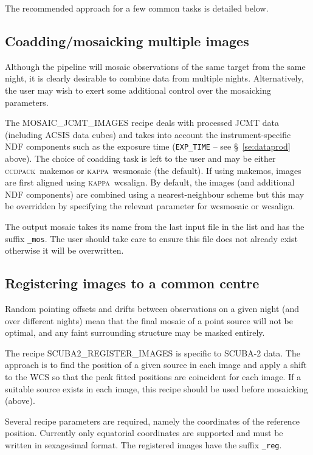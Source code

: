 \documentclass[twoside,11pt,nolof]{starlink}
\providecommand{\CCDPACK}{\textsc{ccdpack}}
\providecommand{\KAPPA}{\textsc{kappa}}
\providecommand{\task}[1]{\textsf{#1}}
\begin{document}
The recommended approach for a few common tasks is detailed below.

\subsection{Coadding/mosaicking multiple images}

Although the pipeline will mosaic observations of the same target from
the same night, it is clearly desirable to combine data from multiple
nights. Alternatively, the user may wish to exert some additional
control over the mosaicking parameters.

The \task{MOSAIC\_JCMT\_IMAGES} recipe deals with processed JCMT data
(including ACSIS data cubes) and takes into account the
instrument-specific NDF components such as the exposure time
(\verb+EXP_TIME+ -- see \S\ \ref{se:dataprod} above). The choice of
coadding task is left to the user and may be either
\CCDPACK\ \task{makemos} or \KAPPA\ \task{wcsmosaic} (the default). If
using \task{makemos}, images are first aligned using
\KAPPA\ \task{wcsalign}. By default, the images (and additional NDF
components) are combined using a nearest-neighbour scheme but this may
be overridden by specifying the relevant parameter for
\task{wcsmosaic} or \task{wcsalign}.

The output mosaic takes its name from the last input file in the list
and has the suffix \verb+_mos+. The user should take care to ensure
this file does not already exist otherwise it will be overwritten.

\subsection{Registering images to a common centre\label{se:reg}}

Random pointing offsets and drifts between observations on a given
night (and over different nights) mean that the final mosaic of a
point source will not be optimal, and any faint surrounding structure
may be masked entirely.

The recipe \task{SCUBA2\_REGISTER\_IMAGES} is specific to SCUBA-2
data. The approach is to find the position of a given source in each
image and apply a shift to the WCS so that the peak fitted positions
are coincident for each image. If a suitable source exists in each
image, this recipe should be used before mosaicking (above).

Several recipe parameters are required, namely the coordinates of the
reference position. Currently only equatorial coordinates are
supported and must be written in sexagesimal format. The registered
images have the suffix \verb+_reg+.
\end{document}
